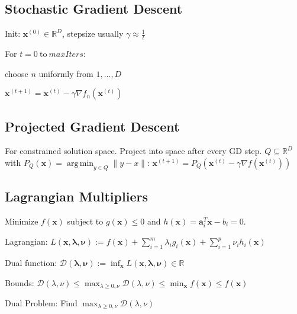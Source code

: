 \documentclass[a4paper, 11pt, landscape]{article}
\DeclareMathOperator*{\argmin}{arg\,min}
\begin{document}
\begin{multicols*}{3}
\subsection{Stochastic Gradient Descent}
\begin{inparaenum}
	\item Init: $\mathbf{x}^{(0)} \in \mathbb{R}^D$, stepsize usually $\gamma \approx \frac{1}{t}$
	\item For $t = 0 \ \text{to} \ \mathit{maxIters}$:
	\item choose $n$ uniformly from $1, \ldots, D$
	\item $\mathbf{x}^{(t+1)} = \mathbf{x}^{(t)} - \gamma \nabla f_n(\mathbf{x}^{(t)})$
\end{inparaenum}

\subsection{Projected Gradient Descent}
For constrained solution space. Project into space after every GD step. $Q \subseteq \mathbb{R}^D$ with $P_Q(\mathbf{x}) = \argmin_{y \in Q} \|y - x\|$: $\mathbf{x}^{(t+1)} = P_Q\left(\mathbf{x}^{(t)} - \gamma \nabla f(\mathbf{x}^{(t)})\right)$

\subsection{Lagrangian Multipliers}
Minimize  $f(\mathbf{x})$ subject to $g(\mathbf{x}) \leq 0$ and $h(\mathbf{x}) = \mathbf{a}_i^T \mathbf{x} - b_i = 0$.
\begin{compactdesc}
	\item[Lagrangian:] $L(\mathbf{x}, \boldsymbol{\lambda}, \boldsymbol{\nu}) := f(\mathbf{x}) + \sum_{i=1}^m \lambda_i g_i(\mathbf{x}) + \sum_{i=1}^p \nu_i h_i(\mathbf{x})$
	\item[Dual function:] $\mathcal{D}(\boldsymbol{\lambda}, \boldsymbol{\nu}) := \inf_{\mathbf{x}} L(\mathbf{x}, \boldsymbol{\lambda}, \boldsymbol{\nu}) \in \mathbb{R}$
	\item[Bounds:] $\mathcal{D}(\lambda,\nu) \leq \max_{\lambda \geq 0,\nu}\mathcal{D}(\lambda,\nu) \leq \min_{\mathbf{x}}f(\mathbf{x}) \leq f(\mathbf{x})$
	\item[Dual Problem:] Find $\max_{\lambda \geq 0,\nu}\mathcal{D}(\lambda,\nu)$
\end{compactdesc}


\end{multicols*}
\end{document}
